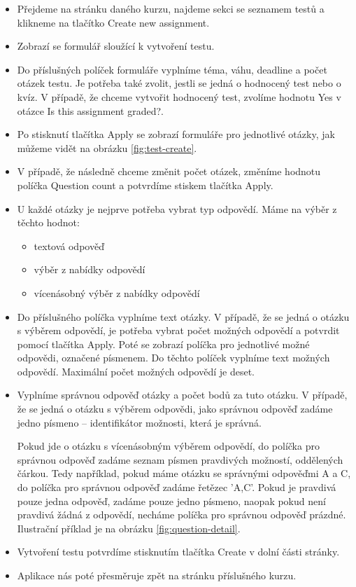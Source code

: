 \begin{itemize}
	\item Přejdeme na stránku daného kurzu, najdeme sekci se seznamem testů a klikneme na tlačítko Create new assignment.
	\item Zobrazí se formulář sloužící k vytvoření testu. 
	\item Do příslušných políček formuláře vyplníme téma, váhu, deadline a počet otázek testu. Je potřeba také zvolit, jestli se jedná o hodnocený test nebo o kvíz. V případě, že chceme vytvořit hodnocený test, zvolíme hodnotu Yes v otázce Is this assignment graded?.
	\item Po stisknutí tlačítka Apply se zobrazí formuláře pro jednotlivé otázky, jak můžeme vidět na obrázku \ref{fig:test-create}.
	\item V případě, že následně chceme změnit počet otázek, změníme hodnotu políčka Question count a potvrdíme stiskem tlačítka Apply.
	\item U každé otázky je nejprve potřeba vybrat typ odpovědí. Máme na výběr z těchto hodnot:
		\begin{itemize}
			\item textová odpověď
			\item výběr z nabídky odpovědí
			\item vícenásobný výběr z nabídky odpovědí
		\end{itemize}
	\item Do příslušného políčka vyplníme text otázky. V případě, že se jedná o otázku s výběrem odpovědí, je potřeba vybrat počet možných odpovědí a potvrdit pomocí tlačítka Apply. Poté se zobrazí políčka pro jednotlivé možné odpovědi, označené písmenem. Do těchto políček vyplníme text možných odpovědí. Maximální počet možných odpovědí je deset.
	\item Vyplníme správnou odpověď otázky a počet bodů za tuto otázku. V případě, že se jedná o otázku s výběrem odpovědi, jako správnou odpověď zadáme jedno písmeno -- identifikátor možnosti, která je správná. 
	
	Pokud jde o otázku s vícenásobným výběrem odpovědí, do políčka pro správnou odpověď zadáme seznam písmen pravdivých možností, oddělených čárkou. Tedy například, pokud máme otázku se správnými odpověďmi A a C, do políčka pro správnou odpověď zadáme řetězec 'A,C'. Pokud je pravdivá pouze jedna odpověď, zadáme pouze jedno písmeno, naopak pokud není pravdivá žádná z odpovědí, necháme políčka pro správnou odpověď prázdné. Ilustrační příklad je na obrázku \ref{fig:question-detail}.
	\item Vytvoření testu potvrdíme stisknutím tlačítka Create v dolní části stránky.
	\item Aplikace nás poté přesměruje zpět na stránku příslušného kurzu.
\end{itemize}

